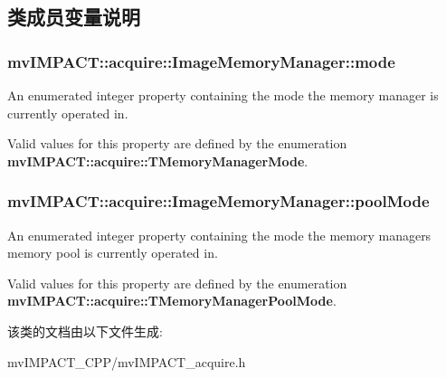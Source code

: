 \subsection{类成员变量说明}
\hypertarget{classmv_i_m_p_a_c_t_1_1acquire_1_1_image_memory_manager_a614cfb478184bf6cb714e21feb93b624}{
\subsubsection[{mode}]{ mv\+I\+M\+P\+A\+C\+T\+::acquire\+::\+Image\+Memory\+Manager\+::mode}}\label{classmv_i_m_p_a_c_t_1_1acquire_1_1_image_memory_manager_a614cfb478184bf6cb714e21feb93b624}


An enumerated integer property containing the mode the memory manager is currently operated in. 

Valid values for this property are defined by the enumeration {\bfseries mv\+I\+M\+P\+A\+C\+T\+::acquire\+::\+T\+Memory\+Manager\+Mode}. \hypertarget{classmv_i_m_p_a_c_t_1_1acquire_1_1_image_memory_manager_a79a4b7dd428194879403ea8f328b0c42}{
\subsubsection[{pool\+Mode}]{ mv\+I\+M\+P\+A\+C\+T\+::acquire\+::\+Image\+Memory\+Manager\+::pool\+Mode}}\label{classmv_i_m_p_a_c_t_1_1acquire_1_1_image_memory_manager_a79a4b7dd428194879403ea8f328b0c42}


An enumerated integer property containing the mode the memory managers memory pool is currently operated in. 

Valid values for this property are defined by the enumeration {\bfseries mv\+I\+M\+P\+A\+C\+T\+::acquire\+::\+T\+Memory\+Manager\+Pool\+Mode}. 

该类的文档由以下文件生成\+:\begin{DoxyCompactItemize}
\item 
mv\+I\+M\+P\+A\+C\+T\+\_\+\+C\+P\+P/mv\+I\+M\+P\+A\+C\+T\+\_\+acquire.\+h\end{DoxyCompactItemize}
